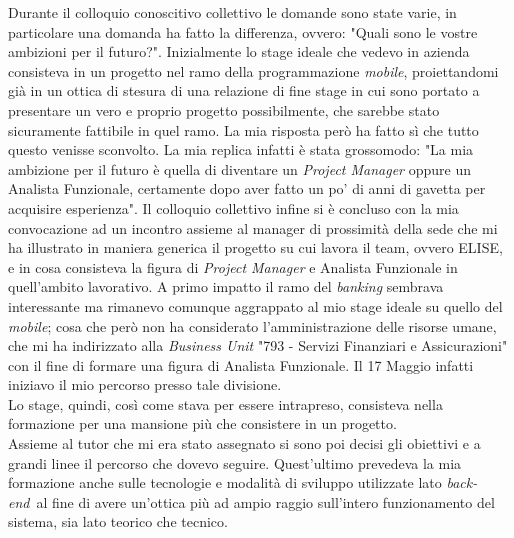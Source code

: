 
Durante il colloquio conoscitivo collettivo le domande sono state varie, in particolare una domanda ha fatto la differenza, ovvero: "Quali sono le vostre ambizioni per il futuro?". Inizialmente lo stage ideale che vedevo in azienda consisteva in un progetto nel ramo della programmazione \textit{mobile}, proiettandomi già in un ottica di stesura di una relazione di fine stage in cui sono portato a presentare un vero e proprio progetto possibilmente, che sarebbe stato sicuramente fattibile in quel ramo. La mia risposta però ha fatto sì che tutto questo venisse sconvolto. La mia replica infatti è stata grossomodo: "La mia ambizione per il futuro è quella di diventare un \textit{Project Manager} oppure un Analista Funzionale, certamente dopo aver fatto un po' di anni di gavetta per acquisire esperienza". Il colloquio collettivo infine si è concluso con la mia convocazione ad un incontro assieme al manager di prossimità della sede che mi ha illustrato in maniera generica il progetto su cui lavora il team, ovvero ELISE\glossario, e in cosa consisteva la figura di \textit{Project Manager} e Analista Funzionale in quell'ambito lavorativo. A primo impatto il ramo del \textit{banking} sembrava interessante ma rimanevo comunque aggrappato al mio stage ideale su quello del \textit{mobile}; cosa che però non ha considerato l'amministrazione delle risorse umane, che mi ha indirizzato alla \textit{Business Unit} "793 - Servizi Finanziari e Assicurazioni" con il fine di formare una figura di Analista Funzionale. Il 17 Maggio infatti iniziavo il mio percorso presso tale divisione.\\

Lo stage, quindi, così come stava per essere intrapreso, consisteva nella formazione per una mansione più che consistere in un progetto.\\

Assieme al tutor che mi era stato assegnato si sono poi decisi gli obiettivi e a grandi linee il percorso che dovevo seguire. Quest'ultimo prevedeva la mia formazione anche sulle tecnologie e modalità di sviluppo utilizzate lato \textit{back-end}\glossario\ al fine di avere un'ottica più ad ampio raggio sull'intero funzionamento del sistema, sia lato teorico che tecnico.
	
